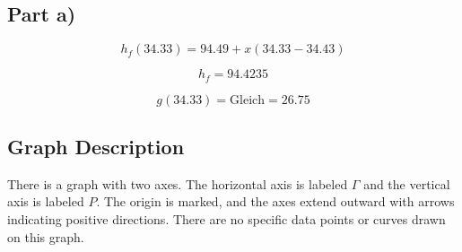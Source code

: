 \subsection*{Part a)}

\[
h_f(34.33) = 94.49 + x \left(34.33 - 34.43\right)
\]

\[
h_f = 94.4235
\]

\[
g(34.33) = \text{Gleich} = 26.75
\]

\subsection*{Graph Description}

There is a graph with two axes. The horizontal axis is labeled $\Gamma$ and the vertical axis is labeled $P$. The origin is marked, and the axes extend outward with arrows indicating positive directions. There are no specific data points or curves drawn on this graph.
